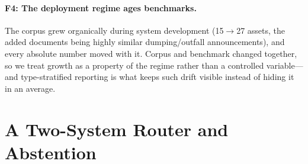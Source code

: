 \documentclass[runningheads]{llncs}
\begin{document}
\paragraph{F4: The deployment regime ages benchmarks.} The corpus grew
organically during system development (15$\to$27 assets, the added documents
being highly similar dumping/outfall announcements), and every absolute
number moved with it. Corpus and benchmark changed together, so we treat
growth as a property of the regime rather than a controlled variable---and
type-stratified reporting is what keeps such drift visible instead of hiding
it in an average.

\section{A Two-System Router and Abstention}
\label{sec:route}
\end{document}
